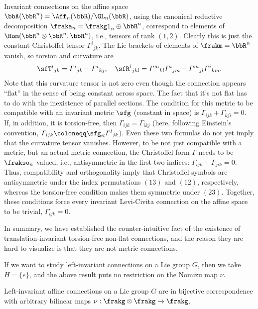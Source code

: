 \begin{example}
    Invariant connections on the affine space $\bbA(\bbR^n)=\Aff_n(\bbR)\slash \GL_n(\bbR)$, using the canonical reductive decomposition $\fraka_n=\frakgl_n\oplus \bbR^n$, correspond to elements of $\Hom(\bbR^n\otimes \bbR^n,\bbR^n)$, i.e., tensors of rank $(1,2)$. Clearly this is just the constant Christoffel tensor $\varGamma^i{}_{jk}$. The Lie brackets of elements of $\frakm=\bbR^n$ vanish, so torsion and curvature are 
    \[\sfT^i{}_{jk}=\varGamma^i{}_{jk}-\varGamma^i{}_{kj},\quad \sfR^i{}_{jkl}=\varGamma^m{}_{kl}\varGamma^i{}_{jm}-\varGamma^m{}_{jl}\varGamma^i{}_{km}.\] 
    Note that this curvature tensor is not zero even though the connection appears ``flat'' in the sense of being constant across space. The fact that it's not flat has to do with the inexistence of parallel sections. The condition for this metric to be compatible with an invariant metric $\sfg$ (constant in space) is $\varGamma_{ijk}+\varGamma_{kji}=0$. If, in addition, it is torsion-free, then $\varGamma_{ijk}=\varGamma_{ikj}$ (here, following Einstein's convention, $\varGamma_{ijk}\coloneqq \sfg_{il}\varGamma^l{}_{jk}$). Even these two formulas do not yet imply that the curvature tensor vanishes. However, to be not just compatible with a metric, but an actual metric connection, the Christoffel form $\varGamma$ needs to be $\frakso_n$-valued, i.e., antisymmetric in the first two indices: $\varGamma_{ijk}+\varGamma_{jik}=0$. Thus, compatibility and orthogonality imply that Christoffel symbols are antisymmetric under the index permutations $(13)$ and $(12)$, respectively, whereas the torsion-free condition makes them symmetric under $(23)$. Together, these conditions force every invariant Levi-Civita connection on the affine space to be trivial, $\varGamma_{ijk}=0$.

    In summary, we have established the counter-intuitive fact of the existence of translation-invariant torsion-free non-flat connections, and the reason they are hard to visualize is that they are not metric connections.
\end{example}

If we want to study left-invariant connections on a Lie group $G$, then we take $H=\{e\}$, and the above result puts no restriction on the Nomizu map $\nu$.

\begin{cor}
    Left-invariant affine connections on a Lie group $G$ are in bijective correspondence with arbitrary bilinear maps $\nu:\frakg\otimes\frakg\to \frakg$.
\end{cor}

